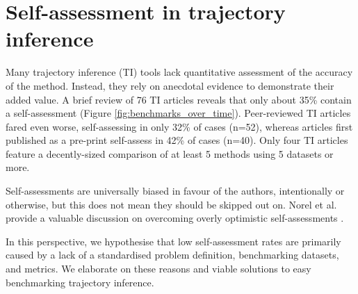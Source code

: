 
\section{Self-assessment in trajectory inference}
Many trajectory inference (TI) tools lack quantitative assessment of the accuracy of the method. Instead, they rely on anecdotal evidence to demonstrate their added value. A brief review of 76 TI articles reveals that only about 35\% contain a self-assessment (Figure \ref{fig:benchmarks_over_time}). Peer-reviewed TI articles fared even worse, self-assessing in only 32\% of cases (n=52), whereas articles first published as a pre-print self-assess in 42\% of cases (n=40). Only four TI articles feature a decently-sized comparison of at least 5 methods using 5 datasets or more.

Self-assessments are universally biased in favour of the authors, intentionally or otherwise, but this does not mean they should be skipped out on. Norel et al. provide a valuable discussion on overcoming overly optimistic self-assessments \cite{norel_selfassessmenttrapcan_2011}.

In this perspective, we hypothesise that low self-assessment rates are primarily caused by a lack of a standardised problem definition, benchmarking datasets, and metrics. 
We elaborate on these reasons and viable solutions to easy benchmarking trajectory inference.


